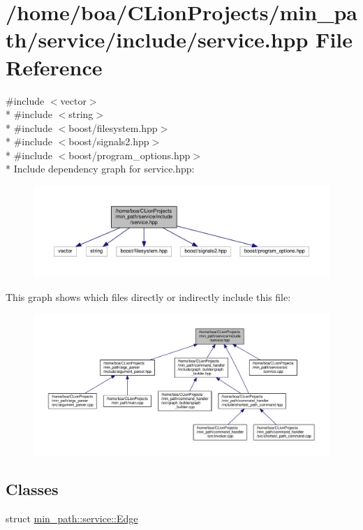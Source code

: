 \hypertarget{a00030}{}\section{/home/boa/\+C\+Lion\+Projects/min\+\_\+path/service/include/service.hpp File Reference}
\label{a00030}
{\ttfamily \#include $<$vector$>$}\\*
{\ttfamily \#include $<$string$>$}\\*
{\ttfamily \#include $<$boost/filesystem.\+hpp$>$}\\*
{\ttfamily \#include $<$boost/signals2.\+hpp$>$}\\*
{\ttfamily \#include $<$boost/program\+\_\+options.\+hpp$>$}\\*
Include dependency graph for service.\+hpp\+:
\nopagebreak
\begin{figure}[H]
\begin{center}
\leavevmode
\includegraphics[width=350pt]{d4/de8/a00061}
\end{center}
\end{figure}
This graph shows which files directly or indirectly include this file\+:
\nopagebreak
\begin{figure}[H]
\begin{center}
\leavevmode
\includegraphics[width=350pt]{df/d03/a00062}
\end{center}
\end{figure}
\subsection*{Classes}
\begin{DoxyCompactItemize}
\item 
struct \hyperlink{a00004}{min\+\_\+path\+::service\+::\+Edge}
\end{DoxyCompactItemize}

